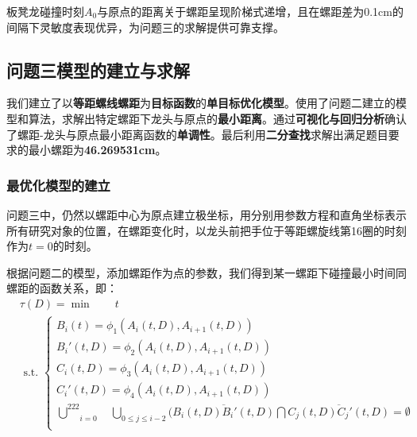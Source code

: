 \documentclass[a4paper]{article}
\begin{document}
板凳龙碰撞时刻$A_0$与原点的距离关于螺距呈现阶梯式递增，且在螺距差为0.1cm的间隔下灵敏度表现优异，为问题三的求解提供可靠支撑。
	\subsection{问题三模型的建立与求解}
 我们建立了以\textbf{等距螺线螺距}为\textbf{目标函数}的\textbf{单目标优化模型}。使用了问题二建立的模型和算法，求解出特定螺距下龙头与原点的\textbf{最小距离}。通过\textbf{可视化与回归分析}确认了螺距-龙头与原点最小距离函数的\textbf{单调性}。最后利用\textbf{二分查找}求解出满足题目要求的最小螺距为\textbf{46.269531cm}。
	\subsubsection{最优化模型的建立}
 问题三中，仍然以螺距中心为原点建立极坐标，用分别用参数方程和直角坐标表示所有研究对象的位置，在螺距变化时，以龙头前把手位于等距螺旋线第16圈的时刻作为$t = 0$的时刻。

 根据问题二的模型，添加螺距作为点的参数，我们得到某一螺距下碰撞最小时间同螺距的函数关系，即：
 		\begin{equation}
   \begin{aligned}
				& \tau(D) = \min \quad \quad t \\
				& \text { s.t. }\left\{\begin{array}{l}
                        B_i(t) = \phi_1(A_i(t, D), A_{i + 1}(t, D))\\
                        B_{i}'(t, D) = \phi_2(A_i(t, D), A_{i + 1}(t, D))\\
                        C_i(t, D) = \phi_3(A_i(t, D), A_{i + 1}(t, D))\\
                        C_{i}'(t, D) = \phi_4(A_i(t, D), A_{i + 1}(t, D))\\
               \underset{i=0}{\overset{222}{\bigcup}}\quad \underset{0\leq j \leq i - 2}{\bigcup}(\overline{B_i(t, D)B_{i}'(t, D)}\bigcap \overline{C_j(t,D)C_{j}'(t, D)} = \emptyset

  \\

				\end{array}\right.
    \end{aligned}
		\end{equation}
\end{document}

